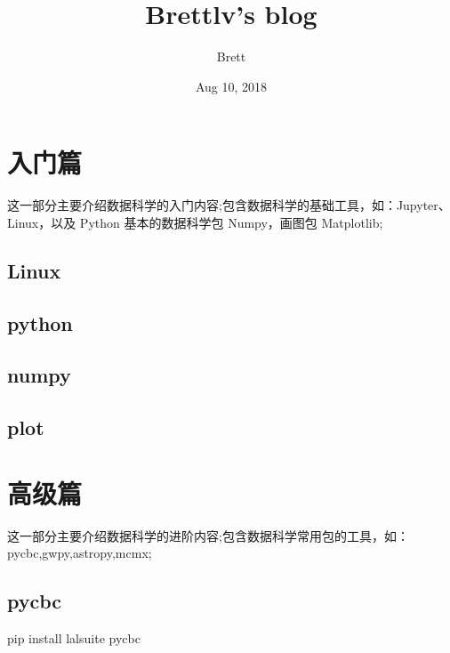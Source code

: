 \documentclass[letterpaper,10pt,english]{sphinxmanual}
\title{Brettlv's blog}
\date{Aug 10, 2018}
\author{Brett}
\begin{document}
\maketitle
\sphinxtableofcontents
{}\label{\detokenize{index::doc}}



\chapter{入门篇}
\label{\detokenize{base/index:welcome-to-brettlv-s-blog}}\label{\detokenize{base/index::doc}}\label{\detokenize{base/index:id1}}
这一部分主要介绍数据科学的入门内容;包含数据科学的基础工具，如：Jupyter、Linux，以及 Python 基本的数据科学包 Numpy，画图包 Matplotlib;


\section{Linux}
\label{\detokenize{base/01_linux::doc}}\label{\detokenize{base/01_linux:linux}}

\section{python}
\label{\detokenize{base/02_ipython:python}}\label{\detokenize{base/02_ipython::doc}}

\section{numpy}
\label{\detokenize{base/03_numpy:numpy}}\label{\detokenize{base/03_numpy::doc}}

\section{plot}
\label{\detokenize{base/04_matplotlib:plot}}\label{\detokenize{base/04_matplotlib::doc}}

\chapter{高级篇}
\label{\detokenize{advanced/index::doc}}\label{\detokenize{advanced/index:id1}}
这一部分主要介绍数据科学的进阶内容;包含数据科学常用包的工具，如：
pycbc,gwpy,astropy,mcmx;


\section{pycbc}
\label{\detokenize{advanced/01_pycbc:pycbc}}\label{\detokenize{advanced/01_pycbc::doc}}
pip install lalsuite pycbc
\end{document}
